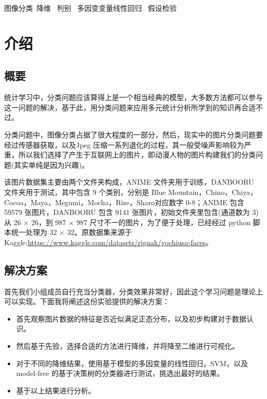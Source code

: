 \documentclass[fleqn]{Paquetes/RevDigMatEduInt}
\begin{document}
	
	\maketitle


\begin{keywords}
	\textcolor{azulTitulos}{图像分类\ 降维 \ 判别 \ 多因变变量线性回归 \ 假设检验}
\end{keywords}

\section{介绍}
\subsection{概要}
统计学习中，分类问题应该算得上是一个相当经典的模型，大多数方法都可以参与这一问题的解决，基于此，用分类问题来应用多元统计分析所学到的知识再合适不过。

分类问题中，图像分类占据了很大程度的一部分，然后，现实中的图片分类问题要经过传感器获取，以及Jpeg 压缩一系列退化的过程，其一般受噪声影响较为严重，所以我们选择了产生于互联网上的图片，即动漫人物的图片构建我们的分类问题(其实单纯是因为兴趣)。

该图片数据集主要由两个文件夹构成，ANIME 文件夹用于训练，DANBOORU 文件夹用于测试，其中包含 9 个类别，分别是 Blue Mountain，Chino，Chiya，Cocoa，Maya，Megumi，Mocha，Rize，Sharo对应数字 0-8；ANIME 包含 59579 张图片，DANBOORU 包含 9141 张图片，初始文件夹里包含(通道数为 $3$)从 26 $\times $ 26，到 987 $\times$ 987 尺寸不一的图片，为了便于处理，已经经过 python 脚本统一处理为 32 $\times $ 32。原数据集来源于 Kaggle:\href{https://www.kaggle.com/datasets/rignak/gochiusa-faces}{\url{https://www.kaggle.com/datasets/rignak/gochiusa-faces}}。

\subsection{解决方案}

首先我们小组成员自行充当分类器，分类效果非常好，因此这个学习问题是理论上可以实现。下面我将阐述这份实验提供的解决方案：

\begin{nota}

\begin{itemize}
	\item 首先观察图片数据的特征是否近似满足正态分布，以及初步构建对于数据认识。
	\item 然后基于先验，选择合适的方法进行降维，并将降至二维进行可视化。
	\item 对于不同的降维结果，使用基于模型的多因变量的线性回归，SVM，以及 model-free 的基于决策树的分类器进行测试，挑选出最好的结果。
	\item 基于以上结果进行分析。
\end{itemize}
\end{nota}
\end{document}
